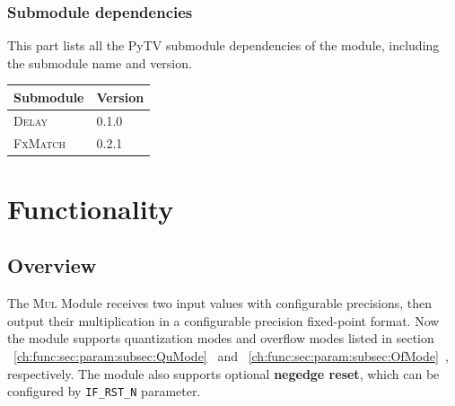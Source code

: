 \documentclass[a4paper, oneside]{report}
\begin{document}
            \subsection{Submodule dependencies}
                This part lists all the PyTV submodule dependencies of the module, including the submodule name and version.
                \begin{longtable}{ll}
                    \toprule
                    \textbf{Submodule} & \textbf{Version} \\
                    \midrule
                    \textsc{Delay}         & 0.1.0 \\
                    \textsc{FxMatch}         & 0.2.1 \\
                    \bottomrule
                \end{longtable}

    \chapter{Functionality}
        \section{Overview}
            The \textsc{Mul} Module receives two input values with configurable precisions, then output their multiplication in a configurable precision fixed-point format. Now the module supports quantization modes and overflow modes listed in section ~\ref{ch:func:sec:param:subsec:QuMode}~ and ~\ref{ch:func:sec:param:subsec:OfMode}~, respectively.  The module also supports optional \textbf{negedge reset}, which can be configured by \texttt{IF\_RST\_N} parameter.
\end{document}
